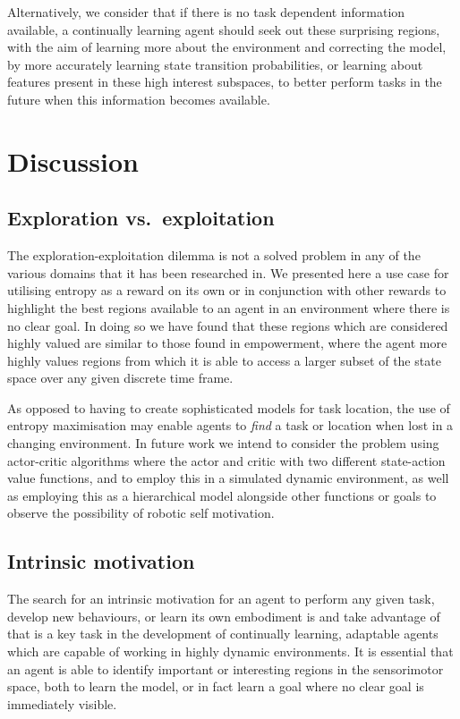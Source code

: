 \documentclass{article}
\begin{document}
Alternatively, we consider that if there is no task dependent information available, a continually learning agent should seek out these surprising regions, with the aim of learning more about the environment and correcting the model, by more accurately learning state transition probabilities, or learning about features present in these high interest subspaces, to better perform tasks in the future when this information becomes available.


\section{Discussion\label{Discussion}}

\subsection{Exploration vs.~exploitation}

The exploration-exploitation dilemma is not a solved problem in any of the various domains that it has been researched in. We presented here a use case for utilising entropy as a reward on its own or in conjunction with other rewards to highlight the best regions available to an agent in an environment where there is no clear goal. In doing so we have found that these regions which are considered highly valued are similar to those found in empowerment, where the agent more highly values regions from which it is able to access a larger subset of the state space over any given discrete time frame.

As opposed to having to create sophisticated models for task location, the use of entropy maximisation may enable agents to \emph{find} a task or location when lost in a changing environment. In future work we intend to consider the problem using actor-critic algorithms where the actor and critic with two different state-action value functions, and to employ this in a simulated dynamic environment, as well as employing this as a hierarchical model alongside other functions or goals to observe the possibility of robotic self motivation.



\subsection{Intrinsic motivation}
The search for an intrinsic motivation for an agent to perform any given task, develop new behaviours, or learn its own embodiment is and take advantage of that is a key task in the development of continually learning, adaptable agents which are capable of working in highly dynamic environments. It is essential that an agent is able to identify important or interesting regions in the sensorimotor space, both to learn the model, or in fact learn a goal where no clear goal is immediately visible. 
\end{document}
